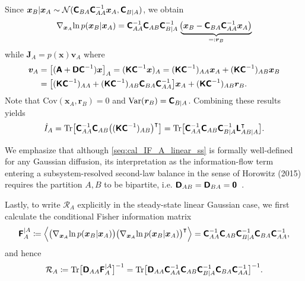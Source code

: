 Since $\bm x_B|\bm x_A\sim\mathcal N(\boldsymbol{\mathsf{C}}_{BA}\boldsymbol{\mathsf{C}}_{AA}^{-1}\bm x_A,\boldsymbol{\mathsf{C}}_{B|A})$, we obtain
\[
    \nabla_{\bm x_A}\!\ln p(\bm x_B|\bm x_A)
    =\boldsymbol{\mathsf{C}}_{AA}^{-1}\boldsymbol{\mathsf{C}}_{AB}\boldsymbol{\mathsf{C}}_{B|A}^{-1}
    \,\underbrace{\!
    \big(\bm x_B-\boldsymbol{\mathsf{C}}_{BA}\boldsymbol{\mathsf{C}}_{AA}^{-1}\bm x_A\big)}_{=:\bm r_B}
\]
while $\bm J_A=p(\bm x)\bm v_A$ where
\begin{equation*}
\begin{aligned}
    \bm v_A&=\big[(\boldsymbol{\mathsf{A}}+\boldsymbol{\mathsf{D}}\boldsymbol{\mathsf{C}}^{-1})\bm x\big]_A
    =(\boldsymbol{\mathsf{K}}\boldsymbol{\mathsf{C}}^{-1}\bm x)_A
    =(\boldsymbol{\mathsf{K}}\boldsymbol{\mathsf{C}}^{-1})_{AA}\bm x_A+(\boldsymbol{\mathsf{K}}\boldsymbol{\mathsf{C}}^{-1})_{AB}\bm x_B
    \\
    &=\big[(\boldsymbol{\mathsf{K}}\boldsymbol{\mathsf{C}}^{-1})_{AA}+(\boldsymbol{\mathsf{K}}\boldsymbol{\mathsf{C}}^{-1})_{AB}\boldsymbol{\mathsf{C}}_{BA}\boldsymbol{\mathsf{C}}_{AA}^{-1}\big]\bm x_A
    +(\boldsymbol{\mathsf{K}}\boldsymbol{\mathsf{C}}^{-1})_{AB}\bm r_B.
\end{aligned}
\end{equation*}
Note that $\mathrm{Cov}(\bm x_A,\bm r_B)=0$ and $\mathrm{Var}(\bm r_B)=\boldsymbol{\mathsf{C}}_{B|A}$.
Combining these results yields
\begin{equation}
    \dot I_A=
    \mathrm{Tr}\big[\boldsymbol{\mathsf{C}}_{AA}^{-1}\boldsymbol{\mathsf{C}}_{AB}\big((\boldsymbol{\mathsf{K}}\boldsymbol{\mathsf{C}}^{-1})_{AB}\big)^\intercal\big]
    =\mathrm{Tr}\big[\boldsymbol{\mathsf{C}}_{AA}^{-1}\boldsymbol{\mathsf{C}}_{AB}\boldsymbol{\mathsf{C}}_{B|A}^{-1}\boldsymbol{\mathsf{L}}_{AB|A}^\intercal\big].
    \label{seq:cal_IF_A_linear_ss}
\end{equation}

We emphasize that although \eqref{seq:cal_IF_A_linear_ss} is formally well-defined for any Gaussian diffusion, its interpretation as the information-flow term entering a subsystem-resolved second-law balance in the sense of Horowitz (2015) requires the partition ${A,B}$ to be bipartite, i.e. $\boldsymbol{\mathsf{D}}_{AB}=\boldsymbol{\mathsf{D}}_{BA}=\boldsymbol{\mathsf{0}}$~\cite{horowitz2015multipartite}.

Lastly, to write $\mathcal R_A$ explicitly in the steady-state linear Gaussian case, we first calculate the conditional Fisher information matrix
\[
    \boldsymbol{\mathsf{F}}_A^{|A}\coloneq
    \Big\langle\big(\nabla_{\bm x_A}\!\ln p(\bm x_B|\bm x_A)\big)
    \big(\nabla_{\bm x_A}\!\ln p(\bm x_B|\bm x_A)\big)^\intercal\Big\rangle
    =\boldsymbol{\mathsf{C}}_{AA}^{-1}\boldsymbol{\mathsf{C}}_{AB}\boldsymbol{\mathsf{C}}_{B|A}^{-1}\boldsymbol{\mathsf{C}}_{BA}\boldsymbol{\mathsf{C}}_{AA}^{-1},
\]
and hence
\begin{equation}
    \mathcal R_A\coloneq
    \mathrm{Tr}\big[\boldsymbol{\mathsf{D}}_{AA}\boldsymbol{\mathsf{F}}_A^{|A}\big]^{-1}
    =\mathrm{Tr}\big[\boldsymbol{\mathsf{D}}_{AA}\boldsymbol{\mathsf{C}}_{AA}^{-1}\boldsymbol{\mathsf{C}}_{AB}\boldsymbol{\mathsf{C}}_{B|A}^{-1}\boldsymbol{\mathsf{C}}_{BA}\boldsymbol{\mathsf{C}}_{AA}^{-1}\big]^{-1}.
    \label{seq:cal_R_A}
\end{equation}

